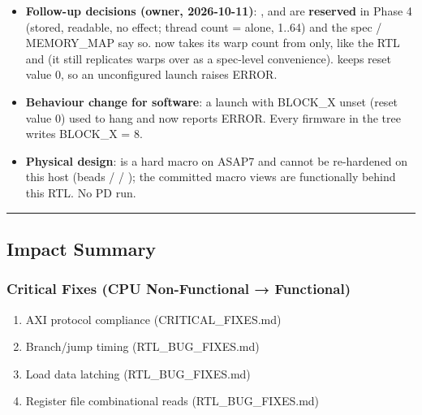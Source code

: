 \begin{record}
\begin{itemize}
   .
  , which pinned the old truncation,
  was replaced.
\item
  \textbf{Follow-up decisions (owner, 2026-10-11)}: ,
   and  are \textbf{reserved} in Phase 4
  (stored, readable, no effect; thread count =  alone,
  1..64) and the spec / MEMORY\_\allowbreak{}MAP say so.
   now takes its warp count from
   only, like the RTL and  (it
  still replicates warps over  as a spec-level
  convenience).  keeps reset value 0, so an unconfigured
  launch raises ERROR.
\item
  \textbf{Behaviour change for software}: a launch with BLOCK\_X unset
  (reset value 0) used to hang and now reports ERROR. Every firmware in
  the tree writes BLOCK\_X = 8.
\item
  \textbf{Physical design}:  is a hard macro on ASAP7 and
  cannot be re-hardened on this host (beads  /  /
  ); the committed macro views are functionally behind this
  RTL. No PD run.
\end{itemize}

\begin{center}\rule{0.5\linewidth}{0.5pt}\end{center}

\end{record}

\subsection{Impact Summary}\label{cr:fix:fixes-index:impact-summary}

\subsubsection{Critical Fixes (CPU Non-Functional → Functional)}\label{cr:fix:fixes-index:critical-fixes-cpu-non-functional-functional}

\begin{record}

\begin{enumerate}
\def\labelenumi{\arabic{enumi}.}
\tightlist
\item
  \ok{} AXI protocol compliance (CRITICAL\_\allowbreak{}FIXES.md)
\item
  \ok{} Branch/\allowbreak{}jump timing
  (RTL\_\allowbreak{}BUG\_\allowbreak{}FIXES.md)
\item
  \ok{} Load data latching
  (RTL\_\allowbreak{}BUG\_\allowbreak{}FIXES.md)
\item
  \ok{} Register file combinational reads
  (RTL\_\allowbreak{}BUG\_\allowbreak{}FIXES.md)
\end{enumerate}

\end{record}

